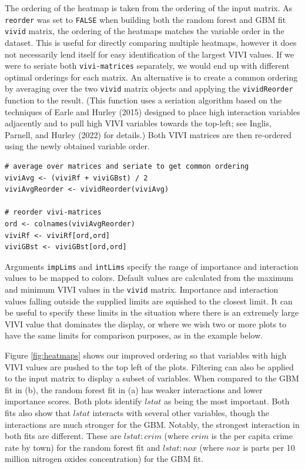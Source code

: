 The ordering of the heatmap is taken from the ordering of the input matrix. As \texttt{reorder} was set to \texttt{FALSE} when building both the random forest and GBM fit \texttt{vivid} matrix, the ordering of the heatmaps matches the variable order in the dataset. This is useful for directly comparing multiple heatmaps, however it does not necessarily lend itself for easy identification of the largest VIVI values. If we were to seriate both \texttt{vivi-matrices} separately, we would end up with different optimal orderings for each matrix. An alternative is to create a common ordering by averaging over the two \texttt{vivid} matrix objects and applying the \texttt{vividReorder} function to the result.
(This function uses a seriation algorithm based on the techniques of Earle and Hurley (2015) designed to place high interaction variables adjacently and to pull high VIVI variables towards the top-left; see Inglis, Parnell, and Hurley (2022) for details.)
Both VIVI matrices are then re-ordered using the newly obtained variable order.

\begin{verbatim}
# average over matrices and seriate to get common ordering
viviAvg <- (viviRf + viviGBst) / 2
viviAvgReorder <- vividReorder(viviAvg)

# reorder vivi-matrices 
ord <- colnames(viviAvgReorder)
viviRf <- viviRf[ord,ord]
viviGBst <- viviGBst[ord,ord]
\end{verbatim}

Arguments \texttt{impLims} and \texttt{intLims} specify the range of importance and interaction values to be mapped to colors. Default values are calculated from the maximum and minimum VIVI values in the \texttt{vivid} matrix. Importance and interaction values falling outside the supplied limits are squished to the closest limit. It can be useful to specify these limits in the situation where there is an extremely large VIVI value that dominates the display, or where we wish two or more plots to have the same limits for comparison purposes, as in the example below.

Figure \ref{fig:heatmaps} shows our improved ordering so that variables with high VIVI values are pushed to the top left of the plots. Filtering can also be applied to the input matrix to display a subset of variables. When compared to the GBM fit in (b), the random forest fit in (a) has weaker interactions and lower importance scores. Both plots identify \(lstat\) as being the most important. Both fits also show that \(lstat\) interacts with several other variables, though the interactions are much stronger for the GBM. Notably, the strongest interaction in both fits are different. These are \(lstat:crim\) (where \(crim\) is the per capita crime rate by town) for the random forest fit and \(lstat:nox\) (where \(nox\) is parts per 10 million nitrogen oxides concentration) for the GBM fit.

